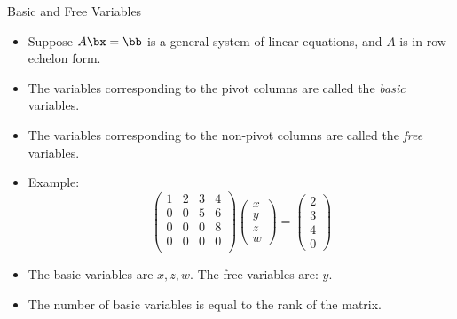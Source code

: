 \documentclass{beamer}
\begin{document}
\begin{frame}{Basic and Free Variables}

\begin{itemize}
\item Suppose $A\bx=\bb$ is a general system of linear equations, and $A$ is in row-echelon form.
\item The variables corresponding to the pivot columns are called the \emph{basic} variables.
\item The variables corresponding to the non-pivot columns are called the \emph{free} variables.
\item Example:
$$
\begin{pmatrix}
1 & 2 & 3 & 4 \\
0 & 0 & 5 & 6 \\
0 & 0 & 0 & 8 \\
0 & 0 & 0 & 0 \\
\end{pmatrix}
\begin{pmatrix}
x \\ y \\ z \\ w
\end{pmatrix}
=
\begin{pmatrix}
2 \\ 3 \\ 4 \\ 0
\end{pmatrix}
$$
\item The basic variables are $x,z,w$. The free variables are: $y$.
\item The number of basic variables is equal to the rank of the matrix.
\end{itemize}
\end{frame}
\end{document}
